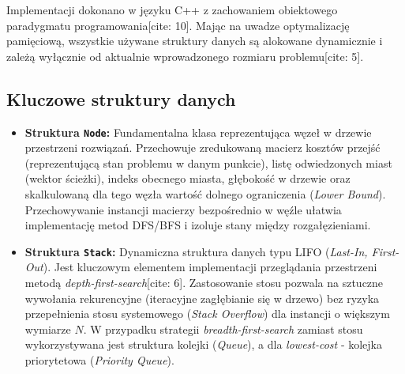 \documentclass[12pt, a4paper]{article}
\begin{document}
Implementacji dokonano w języku C++ z zachowaniem obiektowego paradygmatu programowania[cite: 10]. Mając na uwadze optymalizację pamięciową, wszystkie używane struktury danych są alokowane dynamicznie i zależą wyłącznie od aktualnie wprowadzonego rozmiaru problemu[cite: 5].

\subsection{Kluczowe struktury danych}
\begin{itemize}
	\item \textbf{Struktura \texttt{Node}:} Fundamentalna klasa reprezentująca węzeł w drzewie przestrzeni rozwiązań. Przechowuje zredukowaną macierz kosztów przejść (reprezentującą stan problemu w danym punkcie), listę odwiedzonych miast (wektor ścieżki), indeks obecnego miasta, głębokość w drzewie oraz skalkulowaną dla tego węzła wartość dolnego ograniczenia (\textit{Lower Bound}). Przechowywanie instancji macierzy bezpośrednio w węźle ułatwia implementację metod DFS/BFS i izoluje stany między rozgałęzieniami.
	\item \textbf{Struktura \texttt{Stack}:} Dynamiczna struktura danych typu LIFO (\textit{Last-In, First-Out}). Jest kluczowym elementem implementacji przeglądania przestrzeni metodą \textit{depth-first-search}[cite: 6]. Zastosowanie stosu pozwala na sztuczne wywołania rekurencyjne (iteracyjne zagłębianie się w drzewo) bez ryzyka przepełnienia stosu systemowego (\textit{Stack Overflow}) dla instancji o większym wymiarze $N$. W przypadku strategii \textit{breadth-first-search} zamiast stosu wykorzystywana jest struktura kolejki (\textit{Queue}), a dla \textit{lowest-cost} - kolejka priorytetowa (\textit{Priority Queue}).
\end{itemize}
\end{document}
